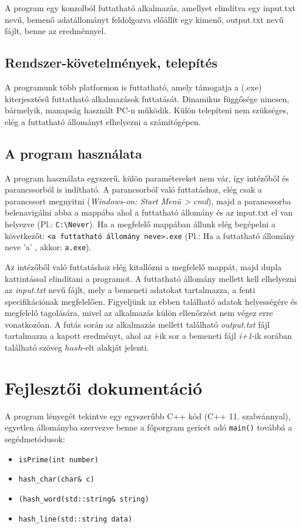 \documentclass[12pt]{article}
\begin{document}
A program egy konzolból futtatható alkalmazás, amellyet elindítva egy input.txt nevű, bemenő adatállományt feldolgozva előállít egy kimenő, output.txt nevű fájlt, benne az eredménnyel.

\subsection{Rendszer-követelmények, telepítés}

A programunk több platformon is futtatható, amely támogatja a (.exe) kiterjesztésű futtatható alkalmazások futtatását. Dinamikus függősége nincsen, bármelyik, manapság használt PC-n működik. Külön telepíteni nem szükséges, elég a futtatható állományt elhelyezni a számítógépen.

\subsection{A program használata}

A program használata egyszerű, külön paramétereket nem vár, így intézőből és parancssorból is indítható. A parancsorból való futtatáshoz, elég csak a parancssort megnyitni (\textit{Windows-on: Start Menü > cmd}), majd a parancssorba belenavigálni abba a mappába ahol a futtatható állomány és az input.txt el van helyezve (Pl.: \verb|C:\Never|). Ha a megfelelő mappában állunk elég begépelni a következőt: \verb|<a futtatható állomány neve>.exe| (Pl.: Ha a futtatható állomány neve 'a' , akkor: \verb|a.exe|).

Az intézőből való futtatáshoz elég kitallózni a megfelelő mappát, majd dupla kattintással elindítani a programot. A futtatható állomány mellett kell elhelyezni az \textit{input.txt} nevű fájlt, mely a bemeneti adatokat tartalmazza, a fenti specifikációnak megfelelően. Figyeljünk az ebben található adatok helyességére és megfelelő tagolására, mivel az alkalmazás külön ellenőrzést nem végez erre vonatkozóan. A futás során az alkalmazás mellett található \textit{output.txt} fájl tartalmazza a kapott eredményt, ahol az \textit{i}-ik sor a bemeneti fájl \textit{i+1}-ik sorában található szöveg $hash$-elt alakját jelenti.

\section{Fejlesztői dokumentáció}

A program lényegét tekintve egy egyszerűbb C++ kód (C++ 11. szabvánnyal), egyetlen állományba szervezve benne a főporgram gericét adó \verb|main()| továbbá a segédmetódusok:
\begin{itemize}
    \item \verb|isPrime(int number)|
    \item \verb|hash_char(char& c)|
    \item \verb|(hash_word(std::string& string)|
    \item \verb|hash_line(std::string data)|
\end{itemize}
\end{document}
